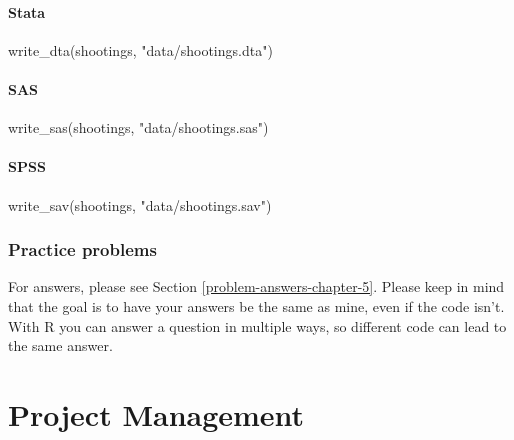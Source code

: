 \documentclass[
]{krantz}
\makeatletter
\newenvironment{Shaded}{\begin{snugshade}}{\end{snugshade}}
\newcommand{\FunctionTok}[1]{\textcolor[rgb]{0,0,0}{#1}}
\newcommand{\NormalTok}[1]{#1}
\newcommand{\StringTok}[1]{\textcolor[rgb]{0.5,0.5,0.5}{#1}}
\newenvironment{kframe}{%
\medskip{}
\setlength{\fboxsep}{.8em}
 \def\at@end@of@kframe{}%
 \ifinner\ifhmode%
  \def\at@end@of@kframe{\end{minipage}}%
  \begin{minipage}{\columnwidth}%
 \fi\fi%
 \def\FrameCommand##1{\hskip\@totalleftmargin \hskip-\fboxsep
 \colorbox{shadecolor}{##1}\hskip-\fboxsep
     \hskip-\linewidth \hskip-\@totalleftmargin \hskip\columnwidth}%
 \MakeFramed {\advance\hsize-\width
   \@totalleftmargin\z@ \linewidth\hsize
   \@setminipage}}%
 {\par\unskip\endMakeFramed%
 \at@end@of@kframe}
\renewenvironment{Shaded}{\begin{kframe}}{\end{kframe}}
\makeatother
\begin{document}
\hypertarget{stata-1}{%
\subsection{Stata}\label{stata-1}}

\begin{Shaded}
\begin{Highlighting}[]
\FunctionTok{write\_dta}\NormalTok{(shootings, }\StringTok{"data/shootings.dta"}\NormalTok{)}
\end{Highlighting}
\end{Shaded}

\hypertarget{sas-1}{%
\subsection{SAS}\label{sas-1}}

\begin{Shaded}
\begin{Highlighting}[]
\FunctionTok{write\_sas}\NormalTok{(shootings, }\StringTok{"data/shootings.sas"}\NormalTok{)}
\end{Highlighting}
\end{Shaded}

\hypertarget{spss-1}{%
\subsection{SPSS}\label{spss-1}}

\begin{Shaded}
\begin{Highlighting}[]
\FunctionTok{write\_sav}\NormalTok{(shootings, }\StringTok{"data/shootings.sav"}\NormalTok{)}
\end{Highlighting}
\end{Shaded}

\hypertarget{practice-problems-3}{%
\section{Practice problems}\label{practice-problems-3}}

For answers, please see Section \ref{problem-answers-chapter-5}. Please keep in mind that the goal is to have your answers be the same as mine, even if the code isn't. With R you can answer a question in multiple ways, so different code can lead to the same answer.

\hypertarget{part-project-management}{%
\part{Project Management}\label{part-project-management}}
\end{document}
